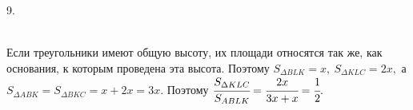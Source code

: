 9. \begin{figure}[ht!]
\end{figure}\\
Если треугольники имеют общую высоту, их площади относятся так же, как основания, к которым проведена эта высота. Поэтому $S_{\Delta BLK}=x,\ S_{\Delta KLC}=2x,$ а $S_{\Delta ABK}=S_{\Delta BKC}=x+2x=3x.$ Поэтому $\cfrac{S_{\Delta KLC}}{S_{ABLK}}=\cfrac{2x}{3x+x}=\cfrac{1}{2}.$\\
